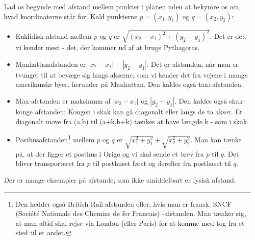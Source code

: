 \documentclass[a4paper, 12pt]{article}
\theoremstyle{remark}
\begin{document}
Lad os begynde med afstand mellem punkter i planen uden at bekymre os om, hvad koordinaterne står for. Kald punkterne $p=(x_1,y_1)$ og $q=(x_2,y_2)$: 
\begin{itemize}
\item Euklidisk afstand mellem $p$ og $q$ er $\sqrt{(x_2-x_1)^2+(y_2-y_1)^2}$. Det er det, vi kender mest - det, der kommer ud af at bruge Pythagoras.
\item Manhattanafstanden er $|x_2-x_1|+|y_2-y_1|$. Det er afstanden, når man er tvunget til at bevæge sig langs akserne, som vi kender det fra vejene i mange amerikanske byer, herunder på Manhattan. Den kaldes også taxi-afstanden. 
\item Max-afstanden er maksimum af   $|x_2-x_1|$ og $|y_2-y_1|$. Den kaldes også skak-konge afstanden: Kongen i skak kan gå diagonalt eller langs de to akser. Et diagonalt move fra (a,b) til (a+k,b+k) tænkes at have længde k - som i skak. 
\item Posthusafstanden\footnote{Den hedder også British Rail afstanden eller, hvis man er fransk, SNCF (Société Nationale des Chemins de fer Francais) -afstanden. Man tænker sig, at man altid skal rejse via London (eller Paris) for at komme med tog fra et sted til et andet.} mellem $p$ og $q$ er $\sqrt{x_1^2+y_1^2}+\sqrt{x_2^2+y_2^2}$. Man kan tænke på, at der ligger et posthus i Origo og vi skal sende et brev fra $p$ til $q$. Det bliver transporteret fra $p$  til posthuset først og derefter fra posthuset til $q$.
\end{itemize}
Der er mange eksempler på afstande, som ikke umiddelbart er fysisk afstand:
\end{document}
